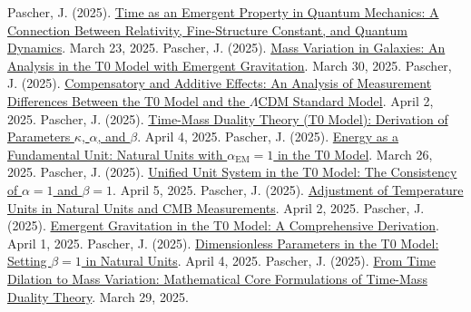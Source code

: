 \documentclass[12pt,a4paper]{article}
\newcommand{\alphaEM}{\alpha_{\text{EM}}}
\begin{document}
	\begin{thebibliography}{99}
		 Pascher, J. (2025). \href{https://github.com/jpascher/T0-Time-Mass-Duality/tree/main/2/pdf/English/ZeitEmergentQMEn.pdf}{Time as an Emergent Property in Quantum Mechanics: A Connection Between Relativity, Fine-Structure Constant, and Quantum Dynamics}. March 23, 2025.
		 Pascher, J. (2025). \href{https://github.com/jpascher/T0-Time-Mass-Duality/tree/main/2/pdf/English/MassVarGalaxienEn.pdf}{Mass Variation in Galaxies: An Analysis in the T0 Model with Emergent Gravitation}. March 30, 2025.
		 Pascher, J. (2025). \href{https://github.com/jpascher/T0-Time-Mass-Duality/tree/main/2/pdf/English/MessdifferenzenT0StandardEn.pdf}{Compensatory and Additive Effects: An Analysis of Measurement Differences Between the T0 Model and the \(\Lambda\)CDM Standard Model}. April 2, 2025.
		 Pascher, J. (2025). \href{https://github.com/jpascher/T0-Time-Mass-Duality/tree/main/2/pdf/English/ZeitMasseT0ParamsEn.pdf}{Time-Mass Duality Theory (T0 Model): Derivation of Parameters \(\kappa\), \(\alpha\), and \(\beta\)}. April 4, 2025.
		 Pascher, J. (2025). \href{https://github.com/jpascher/T0-Time-Mass-Duality/tree/main/2/pdf/English/NatEinheitenAlpha1En.pdf}{Energy as a Fundamental Unit: Natural Units with \(\alphaEM = 1\) in the T0 Model}. March 26, 2025.
		 Pascher, J. (2025). \href{https://github.com/jpascher/T0-Time-Mass-Duality/tree/main/2/pdf/English/Alpha1Beta1KonsistenzEn.pdf}{Unified Unit System in the T0 Model: The Consistency of \(\alpha = 1\) and \(\beta = 1\)}. April 5, 2025.
		 Pascher, J. (2025). \href{https://github.com/jpascher/T0-Time-Mass-Duality/tree/main/2/pdf/English/NatEinheitenAlpha1En.pdf}{Adjustment of Temperature Units in Natural Units and CMB Measurements}. April 2, 2025.
		 Pascher, J. (2025). \href{https://github.com/jpascher/T0-Time-Mass-Duality/tree/main/2/pdf/English/EmergentGravT0En.pdf}{Emergent Gravitation in the T0 Model: A Comprehensive Derivation}. April 1, 2025.
		 Pascher, J. (2025). \href{https://github.com/jpascher/T0-Time-Mass-Duality/tree/main/2/pdf/English/Alpha1Beta1KonsistenzEn.pdf}{Dimensionless Parameters in the T0 Model: Setting \(\beta = 1\) in Natural Units}. April 4, 2025.
		 Pascher, J. (2025). \href{https://github.com/jpascher/T0-Time-Mass-Duality/tree/main/2/pdf/English/MathZeitMasseLagrange.pdf}{From Time Dilation to Mass Variation: Mathematical Core Formulations of Time-Mass Duality Theory}. March 29, 2025.

\end{thebibliography}
\end{document}
